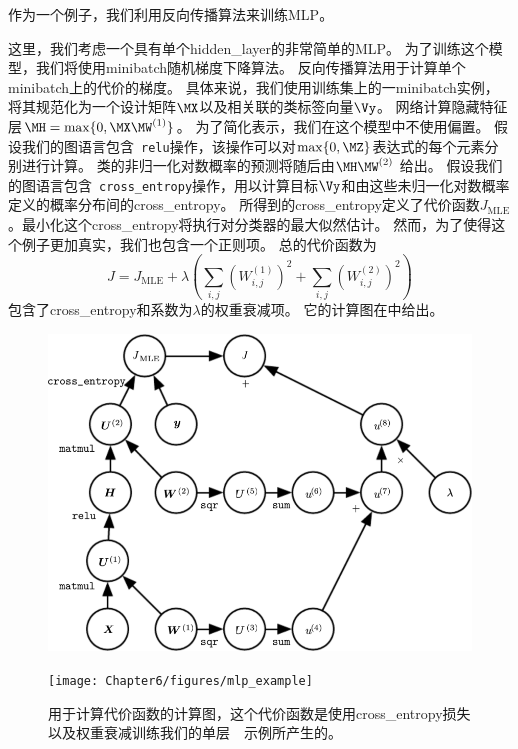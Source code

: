作为一个例子，我们利用反向传播算法来训练\gls{MLP}。

这里，我们考虑一个具有单个\gls{hidden_layer}的非常简单的\gls{MLP}。
为了训练这个模型，我们将使用\gls{minibatch}随机梯度下降算法。
反向传播算法用于计算单个\gls{minibatch}上的代价的梯度。
具体来说，我们使用训练集上的一\gls{minibatch}实例，将其规范化为一个设计矩阵$\MX$以及相关联的类标签向量$\Vy$。
网络计算隐藏特征层$\MH=\max\{0, \MX\MW^{(1)}\}$。
为了简化表示，我们在这个模型中不使用偏置。
假设我们的图语言包含~\verb|relu|操作，该操作可以对$\max\{0,\MZ\}$表达式的每个元素分别进行计算。
类的非归一化对数概率的预测将随后由$\MH\MW^{(2)}$ 给出。
假设我们的图语言包含~\verb|cross_entropy|操作，用以计算目标$\Vy$和由这些未归一化对数概率定义的概率分布间的\gls{cross_entropy}。
所得到的\gls{cross_entropy}定义了代价函数$J_\text{MLE}$。最小化这个\gls{cross_entropy}将执行对分类器的最大似然估计。
然而，为了使得这个例子更加真实，我们也包含一个正则项。
总的代价函数为
\begin{equation}
  J = J_{\text{MLE}} + \lambda \left ( \sum_{i, j} \left (W_{i, j}^{(1)} \right )^2 + \sum_{i, j} \left (W_{i, j}^{(2)} \right)^2 \right )
\end{equation}
包含了\gls{cross_entropy}和系数为$\lambda$的权重衰减项。
它的计算图在中给出。
\begin{figure}[!htb]
\ifOpenSource
\centerline{\includegraphics[scale=0.5]{images/53.png}}
\else
\centerline{\texttt{[image: Chapter6/figures/mlp\_example]}}
\fi
\caption{用于计算代价函数的计算图，这个代价函数是使用\gls{cross_entropy}损失以及权重衰减训练我们的单层~~示例所产生的。}
\label{fig:chap6_mlp_example}
\end{figure}

